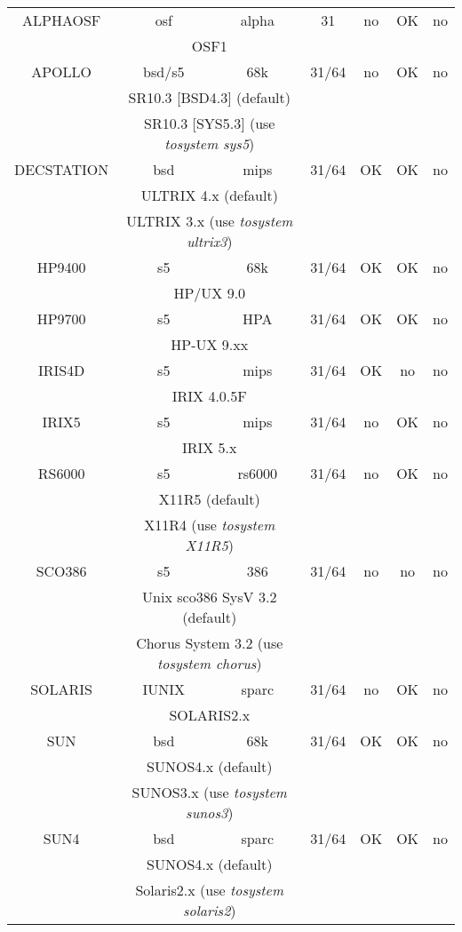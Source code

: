 \begin{center}
\begin{tabular}{|c||c|c||c|c|c|c|}
ALPHAOSF &
osf &
alpha &
31 &
no &
OK &
no
 \\ \cline{2-3}
 & \multicolumn{2}{|c||}{
OSF1 } & & & &
 \\ \hline \hline
APOLLO &
bsd/s5 &
68k &
31/64 &
no &
OK &
no
 \\ \cline{2-3}
 & \multicolumn{2}{|c||}{
SR10.3 [BSD4.3] (default) } & & & & \\
 & \multicolumn{2}{|c||}{
SR10.3 [SYS5.3] (use {\it tosystem sys5}) } & & & &
 \\ \hline \hline
DECSTATION &
bsd &
mips &
31/64 &
OK &
OK &
no
 \\ \cline{2-3}
 & \multicolumn{2}{|c||}{
ULTRIX 4.x (default) } & & & & \\
 & \multicolumn{2}{|c||}{
ULTRIX 3.x (use {\it tosystem ultrix3}) } & & & &
 \\ \hline \hline
HP9400 &
s5 &
68k &
31/64 &
OK &
OK &
no
 \\ \cline{2-3}
 & \multicolumn{2}{|c||}{
HP/UX 9.0 } & & & &
 \\ \hline \hline
HP9700 &
s5 &
HPA &
31/64 &
OK &
OK &
no
 \\ \cline{2-3}
 & \multicolumn{2}{|c||}{
HP-UX 9.xx } & & & &
 \\ \hline \hline
IRIS4D &
s5 &
mips &
31/64 &
OK &
no &
no
 \\ \cline{2-3}
 & \multicolumn{2}{|c||}{
IRIX 4.0.5F } & & & &
 \\ \hline \hline
IRIX5 &
s5 &
mips &
31/64 &
no &
OK &
no
 \\ \cline{2-3}
 & \multicolumn{2}{|c||}{
IRIX 5.x } & & & &
 \\ \hline \hline
RS6000 &
s5 &
rs6000 &
31/64 &
no &
OK &
no
 \\ \cline{2-3}
 & \multicolumn{2}{|c||}{
X11R5 (default) } & & & & \\
 & \multicolumn{2}{|c||}{
X11R4 (use {\it tosystem X11R5}) } & & & &
 \\ \hline \hline
SCO386 &
s5 &
386 &
31/64 &
no &
no &
no
 \\ \cline{2-3}
 & \multicolumn{2}{|c||}{
Unix sco386 SysV 3.2 (default) } & & & & \\
 & \multicolumn{2}{|c||}{
Chorus System 3.2 (use {\it tosystem chorus}) } & & & &
 \\ \hline \hline
SOLARIS &
IUNIX &
sparc &
31/64 &
no &
OK &
no
 \\ \cline{2-3}
 & \multicolumn{2}{|c||}{
SOLARIS2.x } & & & &
 \\ \hline \hline
SUN &
bsd &
68k &
31/64 &
OK &
OK &
no
 \\ \cline{2-3}
 & \multicolumn{2}{|c||}{
SUNOS4.x (default) } & & & & \\
 & \multicolumn{2}{|c||}{
SUNOS3.x (use {\it tosystem sunos3}) } & & & &
 \\ \hline \hline
SUN4 &
bsd &
sparc &
31/64 &
OK &
OK &
no
 \\ \cline{2-3}
 & \multicolumn{2}{|c||}{
SUNOS4.x (default) } & & & & \\
 & \multicolumn{2}{|c||}{
Solaris2.x (use {\it tosystem solaris2}) } & & & &
 \\ \hline \hline
\end{tabular}

\end{center}

\End
